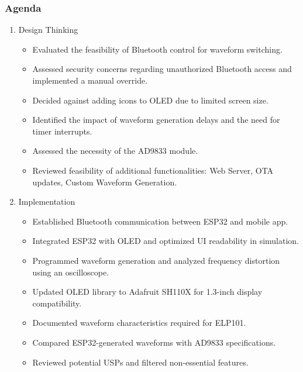 \documentclass[12pt,a4paper]{article}
\begin{document}
\subsubsection*{Agenda}
\begin{enumerate}
    \item Design Thinking
    \begin{itemize}
        \item Evaluated the feasibility of Bluetooth control for waveform switching.
        \item Assessed security concerns regarding unauthorized Bluetooth access and implemented a manual override.
        \item Decided against adding icons to OLED due to limited screen size.
        \item Identified the impact of waveform generation delays and the need for timer interrupts.
        \item Assessed the necessity of the AD9833 module.
        \item Reviewed feasibility of additional functionalities: Web Server, OTA updates, Custom Waveform Generation.
    \end{itemize}
    \item Implementation
    \begin{itemize}
        \item Established Bluetooth communication between ESP32 and mobile app.
        \item Integrated ESP32 with OLED and optimized UI readability in simulation. 
        \item Programmed waveform generation and analyzed frequency distortion using an oscilloscope.
        \item Updated OLED library to Adafruit SH110X for 1.3-inch display compatibility.
        \item Documented waveform characteristics required for ELP101.
        \item Compared ESP32-generated waveforms with AD9833 specifications.
        \item Reviewed potential USPs and filtered non-essential features.
    \end{itemize}
\end{enumerate}
\end{document}
